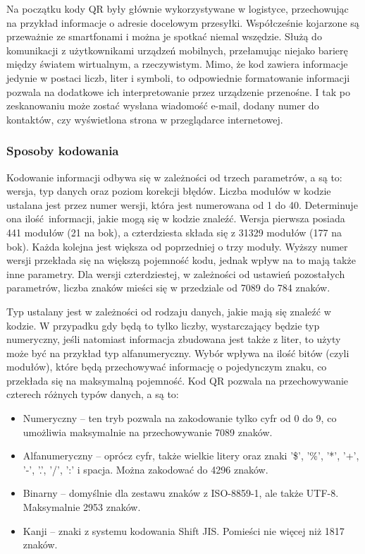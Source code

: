 Na początku kody QR były głównie wykorzystywane w logistyce, przechowując na przykład informacje o adresie docelowym przesyłki. Współcześnie kojarzone są przeważnie ze smartfonami i można je spotkać niemal wszędzie. Służą do komunikacji z użytkownikami urządzeń mobilnych, przełamując niejako barierę między światem wirtualnym, a rzeczywistym. Mimo, że kod zawiera informacje jedynie w postaci liczb, liter i symboli, to odpowiednie formatowanie informacji pozwala na dodatkowe ich interpretowanie przez urządzenie przenośne. I tak po zeskanowaniu może zostać wysłana wiadomość e-mail, dodany numer do kontaktów, czy wyświetlona strona w przeglądarce internetowej.

\subsubsection*{Sposoby kodowania}

Kodowanie informacji odbywa się w zależności od trzech parametrów, a są to: wersja, typ danych oraz poziom korekcji błędów. Liczba modułów w kodzie ustalana jest przez numer wersji, która jest numerowana od 1 do 40. Determinuje ona ilość informacji, jakie mogą się w kodzie znaleźć. Wersja pierwsza posiada 441 modułów (21 na bok), a czterdziesta składa się z 31329 modułów (177 na bok). Każda kolejna jest większa od poprzedniej o trzy moduły. Wyższy numer wersji przekłada się na większą pojemność kodu, jednak wpływ na to mają także inne parametry. Dla wersji czterdziestej, w zależności od ustawień pozostałych parametrów, liczba znaków mieści się w przedziale od 7089 do 784 znaków.

Typ ustalany jest w zależności od rodzaju danych, jakie mają się znaleźć w kodzie. W przypadku gdy będą to tylko liczby, wystarczający będzie typ numeryczny, jeśli natomiast informacja zbudowana jest także z liter, to użyty może być na przykład typ alfanumeryczny. Wybór wpływa na ilość bitów (czyli modułów), które będą przechowywać informację o pojedynczym znaku, co przekłada się na maksymalną pojemność. Kod QR pozwala na przechowywanie czterech różnych typów danych, a są to:

\begin{itemize}
	\item Numeryczny -- ten tryb pozwala na zakodowanie tylko cyfr od 0 do 9, co umożliwia maksymalnie na przechowywanie 7089 znaków.
	\item Alfanumeryczny -- oprócz cyfr, także wielkie litery oraz znaki '\$', '\%', '*', '+', '-', '.', '/', ':' i spacja. Można zakodować do 4296 znaków. 
	\item Binarny -- domyślnie dla zestawu znaków z ISO-8859-1, ale także UTF-8. Maksymalnie 2953 znaków.
	\item Kanji -- znaki z systemu kodowania Shift JIS. Pomieści nie więcej niż 1817 znaków.
\end{itemize}

